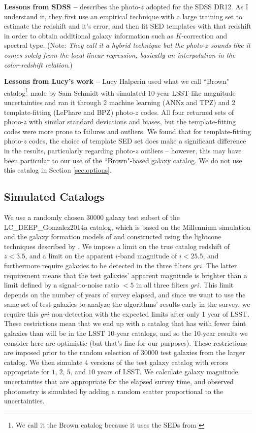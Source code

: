 \documentclass[DM,lsstdraft,toc]{lsstdoc}
\begin{document}
\textbf{Lessons from SDSS --} \cite{2016MNRAS.460.1371B} describes the photo-$z$ adopted for the SDSS DR12. As I understand it, they first use an empirical technique with a large training set to estimate the redshift and it's error, and then fit SED templates with that redshift in order to obtain additional galaxy information such as $K$-correction and spectral type. (Note: {\it They call it a hybrid technique but the photo-$z$ sounds like it comes solely from the local linear regression, basically an interpolation in the color-redshift relation}.)

\textbf{Lessons from Lucy's work --} Lucy Halperin used what we call ``Brown" catalog\footnote{We call it the Brown catalog because it uses the SEDs from \cite{2014ApJS..212...18B}} made by Sam Schmidt with simulated 10-year LSST-like magnitude uncertainties and ran it through 2 machine learning (ANNz and TPZ) and 2 template-fitting (LePhare and BPZ) photo-$z$ codes. All four returned sets of photo-$z$ with similar standard deviations and biases, but the template-fitting codes were more prone to failures and outliers. We found that for template-fitting photo-$z$ codes, the choice of template SED set does make a significant difference in the results, particularly regarding photo-$z$ outliers -- however, this may have been particular to our use of the ``Brown"-based galaxy catalog. We do not use this catalog in Section \ref{sec:options}.

\subsection{Simulated Catalogs}\label{ssec:cats}

We use a randomly chosen 30000 galaxy test subset of the {\sc LC\_DEEP\_Gonzalez2014a} catalog, which is based on the Millennium simulation \citep{2005Natur.435..629S} and the galaxy formation models of \cite{2014MNRAS.439..264G} and constructed using the lightcone techniques described by \cite{2013MNRAS.429..556M}. We impose a limit on the true catalog redshift of $z<3.5$, and a limit on the apparent $i$-band magnitude of $i<25.5$, and furthermore require galaxies to be detected in the three filters $gri$. The latter requirement means that the test galaxies' apparent magnitude is brighter than a limit defined by a signal-to-noise ratio $<5$ in all three filters $gri$. This limit depends on the number of years of survey elapsed, and since we want to use the same set of test galaxies to analyze the algorithms' results early in the survey, we require this $gri$ non-detection with the expected limits after only 1 year of LSST. These restrictions mean that we end up with a catalog that has with fewer faint galaxies than will be in the LSST 10-year catalogs, and so the 10-year results we consider here are optimistic (but that's fine for our purposes). These restrictions are imposed prior to the random selection of 30000 test galaxies from the larger catalog. We then simulate 4 versions of the test galaxy catalog with errors appropriate for $1$, $2$, $5$, and $10$ years of LSST. We calculate galaxy magnitude uncertainties that are appropriate for the elapsed survey time, and observed photometry is simulated by adding a random scatter proportional to the uncertainties.
\end{document}
